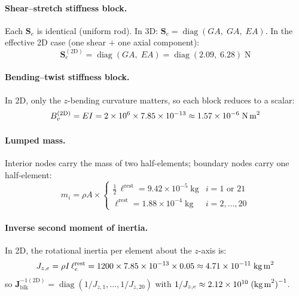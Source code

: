 \documentclass[11pt]{article}
\newcommand{\mat}[1]{\mathbf{#1}}
\begin{document}
\paragraph{Shear--stretch stiffness block.}
Each $\mat{S}_e$ is identical (uniform rod).
In 3D: $\mat{S}_e = \operatorname{diag}(GA,\; GA,\; EA)$.
In the effective 2D case (one shear $+$ one axial component):
\begin{equation}
  \mat{S}_e^{(2\text{D})} = \operatorname{diag}(GA,\; EA) =
  \operatorname{diag}(2.09,\; 6.28)\;\text{N}
  \label{eq:S-block-2d}
\end{equation}

\paragraph{Bending--twist stiffness block.}
In 2D, only the $z$-bending curvature matters, so each block reduces to a scalar:
\begin{equation}
  B_v^{(2\text{D})} = EI = 2 \times 10^6 \times 7.85 \times 10^{-13} \approx 1.57 \times 10^{-6}\;\text{N\,m}^2
  \label{eq:B-block-2d}
\end{equation}

\paragraph{Lumped mass.}
Interior nodes carry the mass of two half-elements; boundary nodes carry one half-element:
\begin{equation}
  m_i = \rho A \times
  \begin{cases}
    \tfrac{1}{2}\,\ell^{\text{rest}} = 9.42 \times 10^{-5}\;\text{kg} & i = 1 \text{ or } 21 \\[3pt]
    \ell^{\text{rest}} = 1.88 \times 10^{-4}\;\text{kg} & i = 2, \ldots, 20
  \end{cases}
  \label{eq:lumped-mass}
\end{equation}

\paragraph{Inverse second moment of inertia.}
In 2D, the rotational inertia per element about the $z$-axis is:
\begin{equation}
  J_{z,e} = \rho I \, \ell_e^{\text{rest}} = 1200 \times 7.85 \times 10^{-13} \times 0.05
    \approx 4.71 \times 10^{-11}\;\text{kg\,m}^2
  \label{eq:Jz-value}
\end{equation}
so $\mat{J}_{\text{blk}}^{-1(2\text{D})} = \operatorname{diag}(1/J_{z,1}, \ldots, 1/J_{z,20})$ with $1/J_{z,e} \approx 2.12 \times 10^{10}\;\text{(kg\,m}^2\text{)}^{-1}$.
\end{document}
